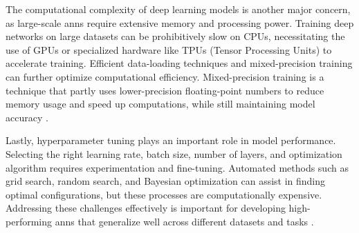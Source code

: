 The computational complexity of deep learning models is another major concern, as large-scale \ac{ann}s require extensive memory and processing power.
Training deep networks on large datasets can be prohibitively slow on CPUs, necessitating the use of GPUs or specialized hardware like TPUs (Tensor Processing Units) to accelerate training.
Efficient data-loading techniques and mixed-precision training can further optimize computational efficiency.
Mixed-precision training is a technique that partly uses lower-precision floating-point numbers to reduce memory usage and speed up computations, while still maintaining model accuracy \cite{pytorchPyTorch}.

Lastly, hyperparameter tuning plays an important role in model performance.
Selecting the right learning rate, batch size, number of layers, and optimization algorithm requires experimentation and fine-tuning.
Automated methods such as grid search, random search, and Bayesian optimization can assist in finding optimal configurations, but these processes are computationally expensive.
Addressing these challenges effectively is important for developing high-performing \ac{ann}s that generalize well across different datasets and tasks \cite{pytorchPyTorch}.

